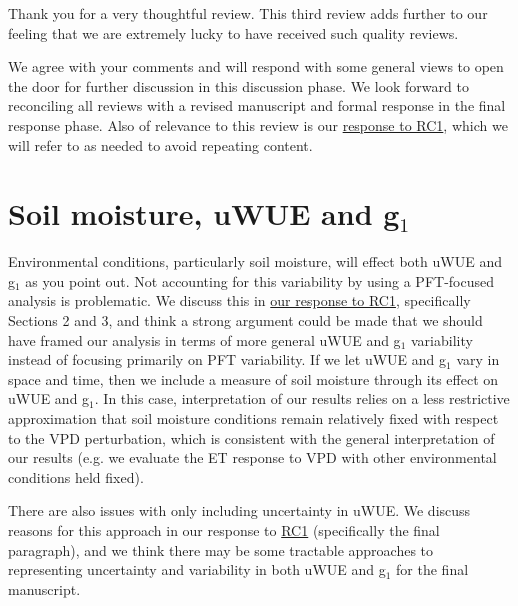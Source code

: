 \documentclass[12pt]{article}
\begin{document}
Thank you for a very thoughtful review. This third review adds further
to our feeling that we are extremely lucky to have received such
quality reviews.

We agree with your comments and will respond with some general views
to open the door for further discussion in this discussion phase. We
look forward to reconciling all reviews with a revised manuscript and
formal response in the final response phase. Also of relevance to this
review is our \href{https://editor.copernicus.org/index.php/hess-2018-553-AC1.pdf?_mdl=msover_md&_jrl=13&_lcm=oc108lcm109w&_acm=get_comm_file&_ms=72556&c=153745&salt=17166479111051651323}{
  response to RC1}, which we will refer to as needed to avoid
repeating content.

\section{Soil moisture, uWUE and g$_1$}
Environmental conditions, particularly soil moisture, will effect both
uWUE and g$_1$ as you point out. Not accounting for this variability
by using a PFT-focused analysis is problematic. We discuss this in
\href{https://editor.copernicus.org/index.php/hess-2018-553-AC1.pdf?_mdl=msover_md&_jrl=13&_lcm=oc108lcm109w&_acm=get_comm_file&_ms=72556&c=153745&salt=17166479111051651323}{our
  response to RC1}, specifically Sections 2 and 3, and think a strong
argument could be made that we should have framed our analysis in
terms of more general uWUE and g$_1$ variability instead of focusing
primarily on PFT variability. If we let uWUE and g$_1$ vary in space
and time, then we include a measure of soil moisture through its
effect on uWUE and g$_1$. In this case, interpretation of our results
relies on a less restrictive approximation that soil moisture
conditions remain relatively fixed with respect to the VPD
perturbation, which is consistent with the general interpretation of
our results (e.g. we evaluate the ET response to VPD with
other environmental conditions held fixed).

There are also issues with only including uncertainty in uWUE. We
discuss reasons for this approach in our response to
\href{https://editor.copernicus.org/index.php/hess-2018-553-AC1.pdf?_mdl=msover_md&_jrl=13&_lcm=oc108lcm109w&_acm=get_comm_file&_ms=72556&c=153745&salt=17166479111051651323}{RC1}
(specifically the final paragraph), and we think there may be some
tractable approaches to representing uncertainty and variability in
both uWUE and g$_1$ for the final manuscript.
\end{document}
